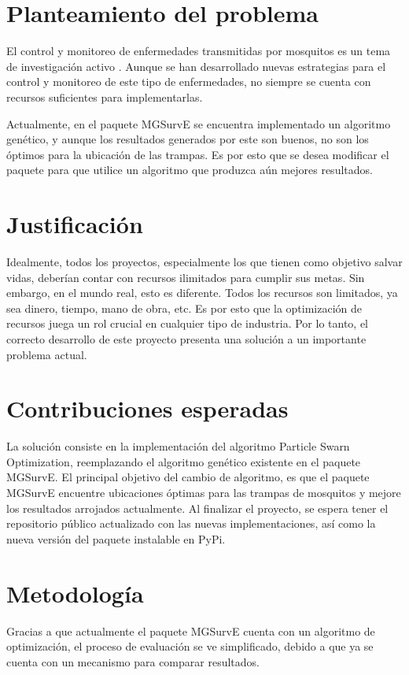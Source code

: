 \documentclass[letterpaper, 10pt, conference]{ieeeconf}
\begin{document}
\section{Planteamiento del problema}
  El control y monitoreo de enfermedades transmitidas por mosquitos es un tema
  de investigación activo \cite{AltStrategies}.
  Aunque se han desarrollado nuevas estrategias para el control y monitoreo de
  este tipo de enfermedades, no siempre se cuenta con recursos suficientes para
  implementarlas.

  Actualmente, en el paquete MGSurvE se encuentra implementado un algoritmo
  genético, y aunque los resultados generados por este son buenos, no son los
  óptimos para la ubicación de las trampas.
  Es por esto que se desea modificar el paquete para que utilice un algoritmo
  que produzca aún mejores resultados. 

\section{Justificación}
  Idealmente, todos los proyectos, especialmente los que tienen como objetivo
  salvar vidas, deberían contar con recursos ilimitados para cumplir sus metas.
  Sin embargo, en el mundo real, esto es diferente.
  Todos los recursos son limitados, ya sea dinero, tiempo, mano de obra, etc.
  Es por esto que la optimización de recursos juega un rol crucial en cualquier
  tipo de industria. Por lo tanto, el correcto desarrollo de este proyecto
  presenta una solución a un importante problema actual.

\section{Contribuciones esperadas}
  La solución consiste en la implementación del algoritmo Particle Swarn
  Optimization, reemplazando el algoritmo genético existente en el paquete
  MGSurvE.
  El principal objetivo del cambio de algoritmo, es que el paquete MGSurvE
  encuentre ubicaciones óptimas para las trampas de mosquitos y mejore los
  resultados arrojados actualmente.
  Al finalizar el proyecto, se espera tener el repositorio público actualizado
  con las nuevas implementaciones, así como la nueva versión del paquete
  instalable en PyPi.

\section{Metodología}
  Gracias a que actualmente el paquete MGSurvE cuenta con un algoritmo de
  optimización, el proceso de evaluación se ve simplificado, debido a que ya se
  cuenta con un mecanismo para comparar resultados.
\end{document}
